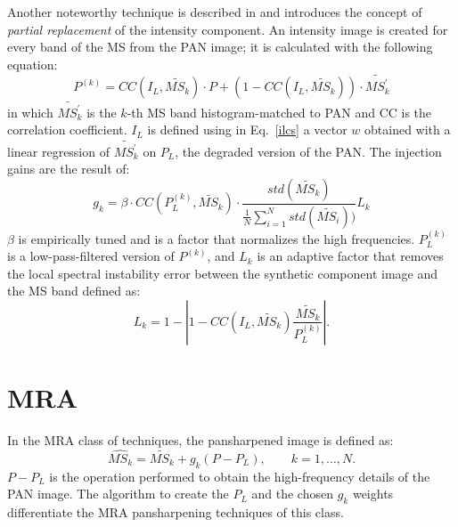 \documentclass[12pt]{report}
\begin{document}
Another noteworthy technique is described in \cite{cs7} and introduces the concept of 
\textit{partial replacement} of the intensity component. An intensity
image is created  for every band of the MS from the PAN image; it is calculated with the following equation:
%
\begin{equation}
    P^{(k)} = CC(I_L, \widetilde{MS_k}) \cdot P + (1 - CC(I_L, \widetilde{MS_k})) \cdot 
    \widetilde{MS_k^{'}}
    \label{pk}
\end{equation}
%
in which $\widetilde{MS_k^{'}}$ is the $k$-th MS band histogram-matched to PAN and CC is the
correlation coefficient.
$I_L$ is defined using in Eq.~\ref{ilcs} a vector $w$  obtained with a linear regression of $\widetilde{MS_k^{'}}$
on $P_L$, the degraded version of the PAN.
The injection gains are the result of:
%
\begin{equation}
    g_k = \beta \cdot CC(P_L^{(k)}, \widetilde{MS_k}) \cdot 
    \frac{std(\widetilde{MS_k})}{\frac{1}{N}\sum_{i=1}^N std(\widetilde{MS_i}))} L_k
    \label{gkpk}
\end{equation}
%
$\beta$ is empirically tuned and is a factor that normalizes the high frequencies.
$P_L^{(k)}$ is a low-pass-filtered version of  $P^{(k)}$,  and $L_k$ is an adaptive factor 
that removes the local spectral instability error between the synthetic component image 
and the MS band defined as:
%
\begin{equation}
    L_k = 1 - \left|1 - CC(I_L, \widetilde{MS_k})\frac{\widetilde{MS_k}}{P_L^{(k)}}\right|.
    \label{lk}
\end{equation}
%

\section{MRA}

In the MRA class of techniques, the pansharpened image is defined as:
%
\begin{equation}
    \widehat{MS_k} = \widetilde{MS_k} + g_k(P - P_L), \qquad k = 1,\dots,N. 
    \label{mra}
\end{equation}
%
$P - P_L$  is the operation performed to obtain the high-frequency details of the PAN image. 
The algorithm to create the $P_L$ and the chosen $g_k$ weights differentiate the MRA 
pansharpening techniques of this class.
\end{document}
